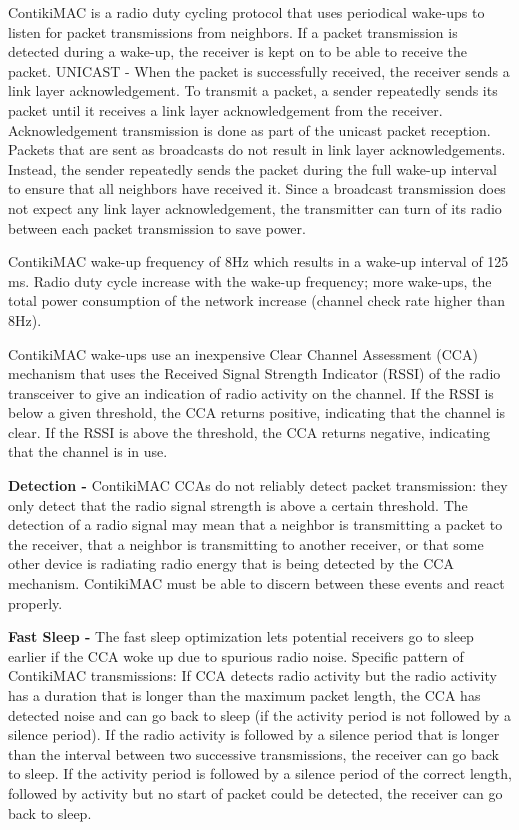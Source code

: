 ContikiMAC is a radio duty cycling protocol that uses periodical wake-ups to listen for packet transmissions from neighbors. If a packet transmission is detected during a wake-up, the receiver is kept on to be able to receive the packet. UNICAST - When the packet is successfully received, the receiver sends a link layer acknowledgement. To transmit a packet, a sender repeatedly sends its packet until it receives a link layer acknowledgement from the receiver. Acknowledgement transmission is done as part of the unicast packet reception. Packets that are sent as broadcasts do not result in link layer acknowledgements. Instead, the sender repeatedly sends the packet during the full wake-up interval to ensure that all neighbors have received it. Since a broadcast transmission does not expect any link layer acknowledgement, the transmitter can turn of its radio between each packet transmission to save power.

ContikiMAC wake-up frequency of 8Hz which results in a wake-up interval of 125 ms. Radio duty cycle increase with the wake-up frequency; more wake-ups, the total power consumption of the network increase (channel check rate higher than 8Hz).

ContikiMAC wake-ups use an inexpensive Clear Channel Assessment (CCA) mechanism that uses the Received Signal Strength Indicator (RSSI) of the radio transceiver to give an indication of radio activity on the channel. If the RSSI is below a given threshold, the CCA returns positive, indicating that the channel is clear. If the RSSI is above the threshold, the CCA returns negative, indicating that the channel is in use.

\textbf{Detection - }
ContikiMAC CCAs do not reliably detect packet transmission: they only detect that the radio signal strength is above a certain threshold. The detection of a radio signal may mean that a neighbor is transmitting a packet to the receiver, that a neighbor is transmitting to another receiver, or that some other device is radiating radio energy that is being detected by the CCA mechanism. ContikiMAC must be able to discern between these events and react properly.

\textbf{Fast Sleep - }
The fast sleep optimization lets potential receivers go to sleep earlier if the CCA woke up due to spurious radio noise. Specific pattern of ContikiMAC transmissions:
	If CCA detects radio activity but the radio activity has a duration that is longer than the maximum packet length, the CCA has detected noise and can go back to sleep (if the activity period is not followed by a silence period).
	If the radio activity is followed by a silence period that is longer than the interval between two successive transmissions, the receiver can go back to sleep.
	If the activity period is followed by a silence period of the correct length, followed by activity but no start of packet could be detected, the receiver can go back to sleep.
	
